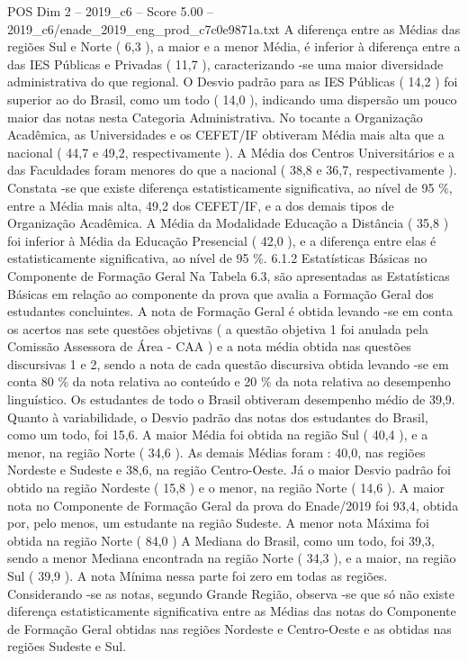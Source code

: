 \begin{textsample}{POS Dim 2 – 2019\_c6 – Score 5.00 – 2019\_c6/enade\_2019\_eng\_prod\_c7c0e9871a.txt}
A diferença entre as Médias das regiões Sul e Norte ( 6,3 ), a maior e a menor Média, é inferior à diferença entre a das IES Públicas e Privadas ( 11,7 ), caracterizando -se uma maior diversidade administrativa do que regional.
O Desvio padrão para as IES Públicas ( 14,2 ) foi superior ao do Brasil, como um todo ( 14,0 ), indicando uma dispersão um pouco maior das notas nesta Categoria Administrativa.
No tocante a Organização Acadêmica, as Universidades e os CEFET/IF obtiveram Média mais alta que a nacional ( 44,7 e 49,2, respectivamente ).
A Média dos Centros Universitários e a das Faculdades foram menores do que a nacional ( 38,8 e 36,7, respectivamente ).
Constata -se que existe diferença estatisticamente significativa, ao nível de 95 \%, entre a Média mais alta, 49,2 dos CEFET/IF, e a dos demais tipos de Organização Acadêmica.
A Média da Modalidade Educação a Distância ( 35,8 ) foi inferior à Média da Educação Presencial ( 42,0 ), e a diferença entre elas é estatisticamente significativa, ao nível de 95 \%. 6.1.2 Estatísticas Básicas no Componente de Formação Geral Na Tabela 6.3, são apresentadas as Estatísticas Básicas em relação ao componente da prova que avalia a Formação Geral dos estudantes concluintes.
A nota de Formação Geral é obtida levando -se em conta os acertos nas sete questões objetivas ( a questão objetiva 1 foi anulada pela Comissão Assessora de Área - CAA ) e a nota média obtida nas questões discursivas 1 e 2, sendo a nota de cada questão discursiva obtida levando -se em conta 80 \% da nota relativa ao conteúdo e 20 \% da nota relativa ao desempenho linguístico.
Os estudantes de todo o Brasil obtiveram desempenho médio de 39,9.
Quanto à variabilidade, o Desvio padrão das notas dos estudantes do Brasil, como um todo, foi 15,6.
A maior Média foi obtida na região Sul ( 40,4 ), e a menor, na região Norte ( 34,6 ).
As demais Médias foram : 40,0, nas regiões Nordeste e Sudeste e 38,6, na região Centro-Oeste.
Já o maior Desvio padrão foi obtido na região Nordeste ( 15,8 ) e o menor, na região Norte ( 14,6 ).
A maior nota no Componente de Formação Geral da prova do Enade/2019 foi 93,4, obtida por, pelo menos, um estudante na região Sudeste.
A menor nota Máxima foi obtida na região Norte ( 84,0 ) A Mediana do Brasil, como um todo, foi 39,3, sendo a menor Mediana encontrada na região Norte ( 34,3 ), e a maior, na região Sul ( 39,9 ).
A nota Mínima nessa parte foi zero em todas as regiões.
Considerando -se as notas, segundo Grande Região, observa -se que só não existe diferença estatisticamente significativa entre as Médias das notas do Componente de Formação Geral obtidas nas regiões Nordeste e Centro-Oeste e as obtidas nas regiões Sudeste e Sul.

\end{textsample}
